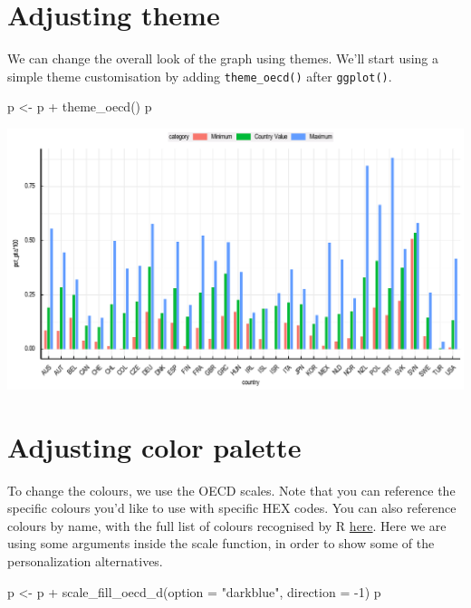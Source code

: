 \documentclass[
  11pt,
  oneside]{report}
\newenvironment{Shaded}{\begin{snugshade}}{\end{snugshade}}
\newcommand{\AttributeTok}[1]{\textcolor[rgb]{0.77,0.63,0.00}{#1}}
\newcommand{\DecValTok}[1]{\textcolor[rgb]{0.00,0.00,0.81}{#1}}
\newcommand{\FunctionTok}[1]{\textcolor[rgb]{0.00,0.00,0.00}{#1}}
\newcommand{\NormalTok}[1]{#1}
\newcommand{\OtherTok}[1]{\textcolor[rgb]{0.56,0.35,0.01}{#1}}
\newcommand{\SpecialCharTok}[1]{\textcolor[rgb]{0.00,0.00,0.00}{#1}}
\newcommand{\StringTok}[1]{\textcolor[rgb]{0.31,0.60,0.02}{#1}}
\begin{document}
\hypertarget{adjusting-theme}{%
\section{Adjusting theme}\label{adjusting-theme}}

We can change the overall look of the graph using themes. We'll start
using a simple theme customisation by adding \texttt{theme\_oecd()}
after \texttt{ggplot()}.

\begin{Shaded}
\begin{Highlighting}[]
\NormalTok{p }\OtherTok{\textless{}{-}}\NormalTok{ p }\SpecialCharTok{+}
  \FunctionTok{theme\_oecd}\NormalTok{()}
\NormalTok{p}
\end{Highlighting}
\end{Shaded}

\begin{center}\includegraphics{book_figures/bar_2-1} \end{center}

\hypertarget{adjusting-color-palette}{%
\section{Adjusting color palette}\label{adjusting-color-palette}}

To change the colours, we use the OECD scales. Note that you can
reference the specific colours you'd like to use with specific HEX
codes. You can also reference colours by name, with the full list of
colours recognised by R
\href{http://www.stat.columbia.edu/~tzheng/files/Rcolor.pdf}{here}. Here
we are using some arguments inside the scale function, in order to show
some of the personalization alternatives.

\begin{Shaded}
\begin{Highlighting}[]
\NormalTok{p }\OtherTok{\textless{}{-}}\NormalTok{ p }\SpecialCharTok{+}
  \FunctionTok{scale\_fill\_oecd\_d}\NormalTok{(}\AttributeTok{option =} \StringTok{"darkblue"}\NormalTok{, }\AttributeTok{direction =} \SpecialCharTok{{-}}\DecValTok{1}\NormalTok{)}
\NormalTok{p}
\end{Highlighting}
\end{Shaded}
\end{document}
